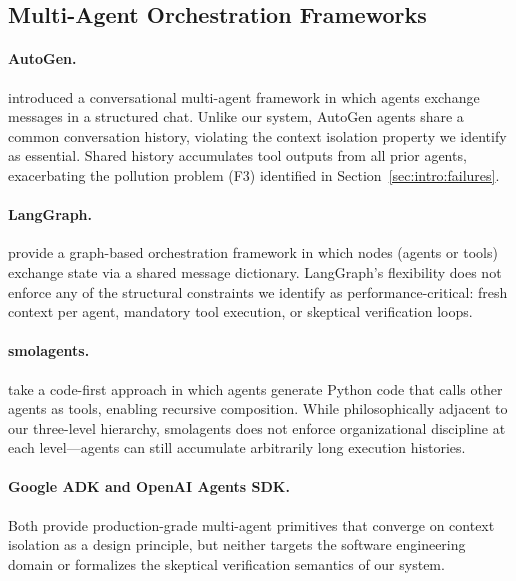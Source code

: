 \subsection{Multi-Agent Orchestration Frameworks}

\paragraph{AutoGen.}
\citet{wu2023autogen} introduced a conversational multi-agent framework in
which agents exchange messages in a structured chat. Unlike our system,
AutoGen agents share a common conversation history, violating the context
isolation property we identify as essential. Shared history accumulates
tool outputs from all prior agents, exacerbating the pollution problem (F3)
identified in Section~\ref{sec:intro:failures}.

\paragraph{LangGraph.}
\citet{chase2024langgraph} provide a graph-based orchestration framework in
which nodes (agents or tools) exchange state via a shared message dictionary.
LangGraph's flexibility does not enforce any of the structural constraints
we identify as performance-critical: fresh context per agent, mandatory
tool execution, or skeptical verification loops.

\paragraph{smolagents.}
\citet{huggingface2024smolagents} take a code-first approach in which agents
generate Python code that calls other agents as tools, enabling recursive
composition. While philosophically adjacent to our three-level hierarchy,
smolagents does not enforce organizational discipline at each level---agents
can still accumulate arbitrarily long execution histories.

\paragraph{Google ADK and OpenAI Agents SDK.}
Both provide production-grade multi-agent primitives
\cite{google2024adk,openai2024agents} that converge on context isolation as
a design principle, but neither targets the software engineering domain
or formalizes the skeptical verification semantics of our system.

